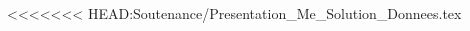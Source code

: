 \begin{frame}
\begin{columns}
\begin{column}{7cm}
\begin{figure}
{}
\end{figure}
\end{column}
\end{columns}
\end{frame}

<<<<<<< HEAD:Soutenance/Presentation_Me_Solution_Donnees.tex
